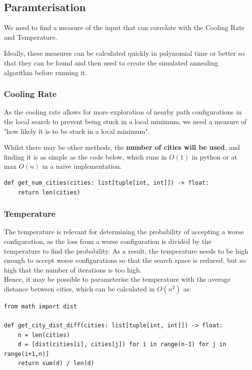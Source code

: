\documentclass{article}
\begin{document}
\subsection{Paramterisation}

We need to find a measure of the input that can correlate with the Cooling Rate and Temperature.

Ideally, these measures can be calculated quickly in polynomial time or better so that they can be found and then used to create the simulated annealing algorithm before running it.

\subsubsection{Cooling Rate}

As the cooling rate allows for more exploration of nearby path configurations in the local search to prevent being stuck in a local minimum, we need a measure of "how likely it is to be stuck in a local minimum".

Whilst there may be other methods, the \textbf{number of cities will be used}, and finding it is as simple as the code below, which runs in $O(1)$ in python or at max $O(n)$ in a naive implementation.

\begin{verbatim}
def get_num_cities(cities: list[tuple[int, int]]) -> float:
    return len(cities)
\end{verbatim}

\subsubsection{Temperature}

The temperature is relevant for determining the probability of accepting a worse configuration, as the loss from a worse configuration is divided by the temperature to find the probability.
As a result, the temperature needs to be high enough to accept worse configurations so that the search space is reduced, but so high that the number of iterations is too high.
\\

Hence, it may be possible to parameterise the temperature with the average distance between cities, which can be calculated in $O(n^2)$ as:

\begin{verbatim}
from math import dist

def get_city_dist_diff(cities: list[tuple[int, int]]) -> float:
    n = len(cities)
    d = [dist(cities[i], cities[j]) for i in range(n-1) for j in range(i+1,n)]
    return sum(d) / len(d)
\end{verbatim}
\end{document}
